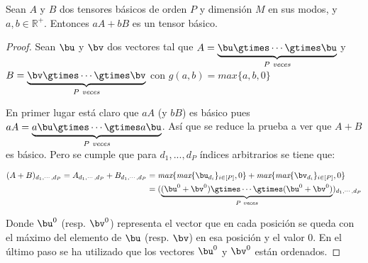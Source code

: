 \begin{prop} \label{prop:basico2}
Sean $A$ y $B$ dos tensores básicos de orden $P$ y dimensión $M$ en sus modos, y $a,b\in \mathbb{R}^+$. Entonces $aA + bB$ es un tensor básico.
\end{prop}
\begin{proof}
Sean $\bu$ y $\bv$ dos vectores tal que  $A = \underbrace{\bu \gtimes \cdots  \gtimes \bu}_{P \textit{ veces}}$ y $B = \underbrace{\bv \gtimes \cdots  \gtimes \bv}_{P \textit{ veces}}$ con $g(a,b) = \textit{max}\{a,b,0\}$

En primer lugar está claro que $aA$ (y $bB$) es básico pues $aA = \underbrace{a\bu \gtimes \cdots  \gtimes a\bu}_{P \textit{ veces}}$. Así que se reduce la prueba a ver que $A + B$ es básico. Pero se cumple que para $d_1,... ,d_{P}$ índices arbitrarios se tiene que:

\begin{align*}
(A + B)_{d_1,\cdots ,d_{P}} = A_{d_1,\cdots ,d_P} + B_{d_1,\cdots ,d_P} 
&= \textit{max}\{\textit{max}\{\bu_{d_i}\}_{i\in [P]},0\} + \textit{max}\{\textit{max}\{\bv_{d_i}\}_{i\in [P]},0\}
\\  &=  (\underbrace{(\bu^0+\bv^0) \gtimes \cdots  \gtimes (\bu^0+\bv^0)}_{P \textit{ veces}})_{d_1,\cdots ,d_P}
\end{align*}

Donde $\bu^0$ (resp. $\bv^0$) representa el vector que en cada posición se queda con el máximo del elemento de $\bu$ (resp. $\bv$) en esa posición y el valor $0$. En el último paso se ha utilizado que los vectores $\bu^0$ y $\bv^0$ están ordenados.
\end{proof}

